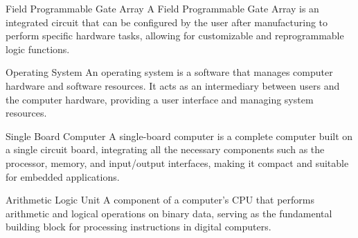 


{Field Programmable Gate Array}
{A Field Programmable Gate Array is an integrated circuit that can be configured by the user after manufacturing to perform specific hardware tasks, allowing for customizable and reprogrammable logic functions.}

{Operating System}
{An operating system is a software that manages computer hardware and software resources. It acts as an intermediary between users and the computer hardware, providing a user interface and managing system resources.}

{Single Board Computer}
{A single-board computer is a complete computer built on a single circuit board, integrating all the necessary components such as the processor, memory, and input/output interfaces, making it compact and suitable for embedded applications.}

{Arithmetic Logic Unit}
{A component of a computer's CPU that performs arithmetic and logical operations on binary data, serving as the fundamental building block for processing instructions in digital computers.}